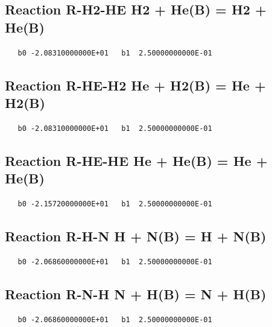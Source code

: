 \documentclass[12pt]{article}
\begin{document}
\subsection{
Reaction R-H2-HE H2 + He(B) = H2 + He(B) }
\begin{small}\begin{verbatim}
   b0 -2.08310000000E+01   b1  2.50000000000E-01
\end{verbatim}\end{small}
\newpage

\subsection{
Reaction R-HE-H2 He + H2(B) = He + H2(B) }
\begin{small}\begin{verbatim}
   b0 -2.08310000000E+01   b1  2.50000000000E-01
\end{verbatim}\end{small}
\newpage

\subsection{
Reaction R-HE-HE He + He(B) = He + He(B) }
\begin{small}\begin{verbatim}
   b0 -2.15720000000E+01   b1  2.50000000000E-01
\end{verbatim}\end{small}
\newpage

\subsection{
Reaction R-H-N H + N(B) = H + N(B) }
\begin{small}\begin{verbatim}
   b0 -2.06860000000E+01   b1  2.50000000000E-01
\end{verbatim}\end{small}
\newpage

\subsection{
Reaction R-N-H N + H(B) = N + H(B) }
\begin{small}\begin{verbatim}
   b0 -2.06860000000E+01   b1  2.50000000000E-01
\end{verbatim}\end{small}
\newpage
\end{document}
